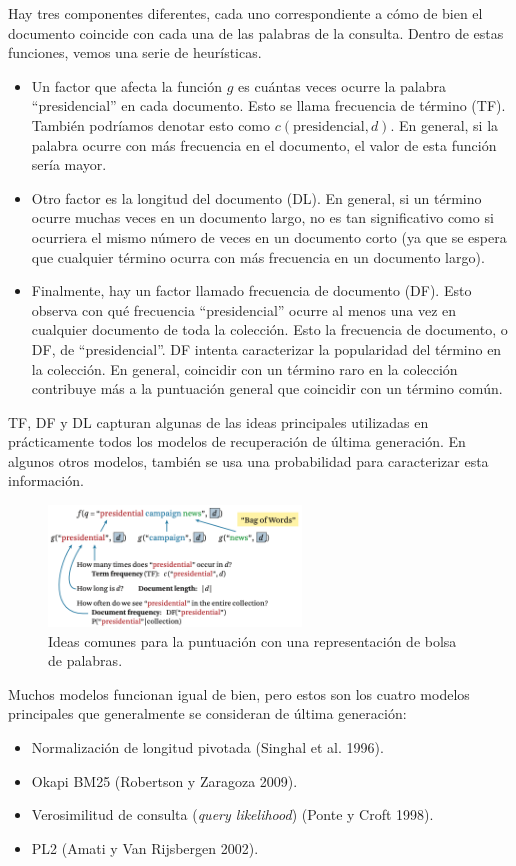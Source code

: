 Hay tres componentes diferentes, cada uno correspondiente a cómo de bien el documento coincide con cada una de las palabras de la consulta. Dentro de estas funciones, vemos una serie de heurísticas.
\begin{itemize}
\item  Un factor que afecta la función $g$ es cuántas veces ocurre la palabra ``presidencial'' en cada documento. Esto se llama frecuencia de término (TF). También podríamos denotar esto como $c(\text{presidencial}, d)$. En general, si la palabra ocurre con más frecuencia en el documento, el valor de esta función sería mayor. 
\item Otro factor es la longitud del documento (DL). En general, si un término ocurre muchas veces en un documento largo, no es tan significativo como si ocurriera el mismo número de veces en un documento corto (ya que se espera que cualquier término ocurra con más frecuencia en un documento largo). 
\item Finalmente, hay un factor llamado frecuencia de documento (DF). Esto observa con qué frecuencia ``presidencial'' ocurre al menos una vez en cualquier documento de toda la colección. Esto la frecuencia de documento, o DF, de ``presidencial''. DF intenta caracterizar la popularidad del término en la colección. En general, coincidir con un término raro en la colección contribuye más a la puntuación general que coincidir con un término común. 
\end{itemize}

TF, DF y DL capturan algunas de las ideas principales utilizadas en prácticamente todos los modelos de recuperación de última generación. En algunos otros modelos, también se usa una probabilidad para caracterizar esta información.

\begin{figure}[h]
\centering
\includegraphics[width=0.6\textwidth]{fotos/16.png}
\caption{Ideas comunes para la puntuación con una representación de bolsa de palabras.}
\label{fig:6.1}
\end{figure}

Muchos modelos funcionan igual de bien, pero estos son los cuatro modelos principales que generalmente se consideran de última generación:
\begin{itemize}
\item Normalización de longitud pivotada (Singhal et al. 1996).
\item Okapi BM25 (Robertson y Zaragoza 2009).
\item Verosimilitud de consulta (\textit{query likelihood}) (Ponte y Croft 1998).
\item PL2 (Amati y Van Rijsbergen 2002).
\end{itemize}


